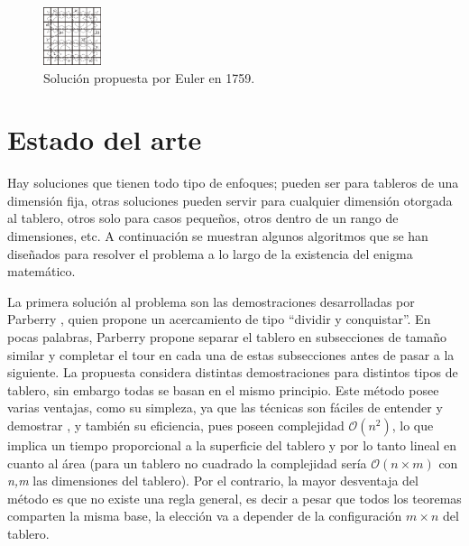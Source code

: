 \documentclass[journal, 10pt]{IEEEtran}
\begin{document}
\begin{figure}[h]

\centering
\includegraphics[width=0.15\textwidth]{figures/EulerKT.png}
\caption{Soluci\'on propuesta por Euler en 1759.}
\label{fig:euler}

\end{figure}
\section{Estado del arte}
Hay soluciones que tienen todo tipo de enfoques; pueden ser para tableros de una dimensión fija, otras soluciones pueden servir para cualquier dimensión otorgada al tablero, otros solo para casos pequeños, otros dentro de un rango de dimensiones, etc. A continuación se muestran algunos algoritmos que se han diseñados para resolver el problema a lo largo de la existencia del enigma matemático.

La primera solución al problema son las demostraciones desarrolladas por Parberry \cite{Parberry:1997}, quien propone un acercamiento de tipo “dividir y conquistar”. En pocas palabras, Parberry propone separar el tablero en subsecciones de tamaño similar y completar el tour en cada una de estas subsecciones antes de pasar a la siguiente. La propuesta considera distintas demostraciones para distintos tipos de tablero, sin embargo todas se basan en el mismo principio. Este método posee varias ventajas, como su simpleza, ya que las técnicas son fáciles de entender y demostrar \cite{Parberry:1997}, y también su eficiencia, pues poseen complejidad $\mathcal{O}(n^2)$, lo que implica un tiempo proporcional a la superficie del tablero y por lo tanto lineal en cuanto al área (para un tablero no cuadrado la complejidad sería $\mathcal{O}(n\times m) $ con \textit{n,m} las dimensiones del tablero). Por el contrario, la mayor desventaja del método es que no existe una regla general, es decir a pesar que todos los teoremas comparten la misma base, la elección va a depender de la configuración $m\times n$ del tablero.
\end{document}
